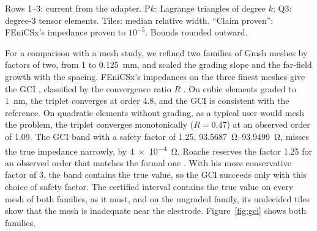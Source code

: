 \documentclass[11pt]{article}
\begin{document}
\begin{table}[t]
\centering
\caption{FEniCSx Potential on Its Own Triangular Mesh}\label{tab:e1own}
\small
{}
\par\vspace{2pt}\footnotesize\raggedright Rows 1--3: current from the adapter. P$k$: Lagrange triangles of degree $k$; Q3: degree-3 tensor elements. Tiles: median relative width. ``Claim proven'': FEniCSx's impedance proven to $10^{-5}$. Bounds rounded outward.
\end{table}

For a comparison with a mesh study, we refined two families of Gmsh meshes by
factors of two, from 1 to \SI{0.125}{mm}, and scaled the grading slope and the
far-field growth with the spacing. FEniCSx's impedances on the three finest meshes
give the GCI \cite{celik2008}, classified by the convergence ratio $R$
\cite{stern2001}. On cubic elements graded to \SI{1}{nm}, the triplet converges at
order 4.8, and the GCI is consistent with the reference. On quadratic elements
without grading, as a typical user would mesh the problem, the triplet converges
monotonically ($R=0.47$) at an observed order of 1.09. The GCI band with a safety
factor of 1.25, \SIrange{93.5687}{93.9499}{\ohm}, misses the true impedance
narrowly, by \SI{4e-4}{\ohm}. Roache reserves the factor 1.25 for an observed order
that matches the formal one \cite{roache1998}. With his more conservative factor of
3, the band contains the true value, so the GCI succeeds only with this choice of
safety factor. The certified interval contains the true value on every mesh of both
families, as it must, and on the ungraded family, its undecided tiles show that the
mesh is inadequate near the electrode. Figure~\ref{fig:gci} shows both families.
\end{document}
